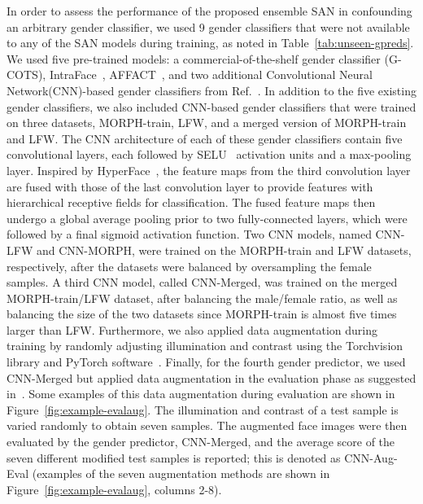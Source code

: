 \documentclass[10pt,twocolumn,letterpaper]{article}
\begin{document}
In order to assess the performance of the proposed ensemble SAN in confounding an arbitrary gender classifier, we used 9 gender classifiers that were not available to any of the SAN models during training, as noted in Table~\ref{tab:unseen-gpreds}. We used five pre-trained models: a commercial-of-the-shelf gender classifier (G-COTS), IntraFace~\cite{de_la_torre_intraface_2015_long}, AFFACT~\cite{gunther_affact_2016}, and two additional Convolutional Neural Network(CNN)-based gender classifiers from Ref.~\cite{arriaga_real_2017}. In addition to the five existing gender classifiers, we also included CNN-based gender classifiers that were trained on three datasets, MORPH-train, LFW, and a merged version of MORPH-train and LFW. The CNN architecture of each of these gender classifiers contain five convolutional layers, each followed by SELU~\cite{klambauer_self_2017} activation units and a max-pooling layer. Inspired by HyperFace~\cite{ranjan_hyperface_2017}, the feature maps from the third convolution layer are fused with those of the last convolution layer to provide  features with hierarchical receptive fields for classification. The fused feature maps then undergo a global average pooling prior to two fully-connected layers, which were followed by a final sigmoid activation function. Two CNN models, named CNN-LFW and CNN-MORPH, were trained on the MORPH-train and LFW datasets, respectively, after the datasets were balanced by oversampling the female samples. A third CNN model, called CNN-Merged, was trained on the merged MORPH-train/LFW dataset, after balancing the male/female ratio, as well as balancing the size of the two datasets since MORPH-train is almost five times larger than LFW. Furthermore, we  also applied data augmentation during training by randomly adjusting illumination and contrast using the Torchvision library and PyTorch software~\cite{paszke_automatic_2017}. Finally, for the fourth gender predictor, we used CNN-Merged but applied data augmentation in the evaluation phase as suggested in~\cite{gunther_affact_2016}. Some examples of this data augmentation during evaluation are shown in Figure~\ref{fig:example-evalaug}. The illumination and contrast of a test sample is varied randomly to obtain seven samples. The augmented face images were then evaluated by the gender predictor, CNN-Merged, and the average score of the seven different modified test samples is reported; this is denoted as CNN-Aug-Eval (examples of the seven augmentation methods are shown in Figure~\ref{fig:example-evalaug}, columns 2-8).
\end{document}
